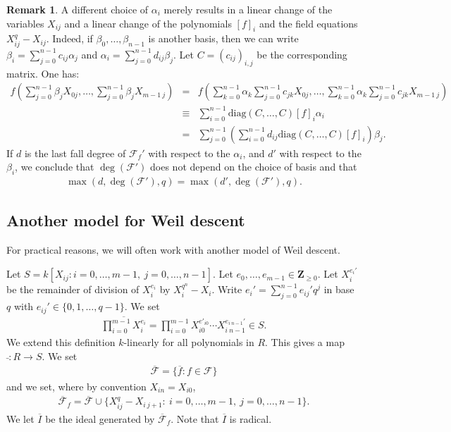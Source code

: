 \documentclass{amsart}
\theoremstyle{plain}
\theoremstyle{definition}
\newtheorem{remark}[theorem]{Remark}
\begin{document}
\begin{remark} \label{812}
A different choice of $\alpha_i$ merely results in a linear change of the variables $X_{ij}$ and a linear change of the polynomials $[f]_i$ and the field equations $X_{ij}^q-X_{ij}$.
Indeed, if $\beta_0,\ldots,\beta_{n-1}$ is another basis, then we can write $\beta_i=\sum_{j=0}^{n-1} c_{ij} \alpha_j$ and $\alpha_i = \sum_{j=0}^{n-1} d_{ij} \beta_j$. Let $C=(c_{ij})_{i,j}$ be the corresponding matrix. One has:
\begin{eqnarray*}
f(\sum_{j=0}^{n-1} \beta_j X_{0j}, \ldots, \sum_{j=0}^{n-1} \beta_j X_{m-1\ j}) &=&  f( \sum_{k=0}^{n-1}  \alpha_k  \sum_{j=0}^{n-1} c_{jk} X_{0j}, \ldots, \sum_{k=0}^{n-1}  \alpha_k  \sum_{j=0}^{n-1} c_{jk} X_{m-1\ j}  ) \\
&\equiv& \sum_{i=0}^{n-1}\mathrm{diag}(C,\ldots,C)  [f]_i \alpha_i \\
&=&\sum_{j=0}^{n-1} \left(   \sum_{i=0}^{n-1}  d_{ij} \mathrm{diag}(C,\ldots,C)  [f]_i \right) \beta_j. 
\end{eqnarray*}
If $d$ is the last fall degree of $\mathcal{F}_f'$ with respect to the $\alpha_i$, and $d'$ with respect to the $\beta_i$, we conclude that $\deg(\mathcal{F}')$ does not depend on the choice of basis and that
\begin{eqnarray*}
\max(d,\deg(\mathcal{F}'),q)=\max(d',\deg(\mathcal{F}'),q).
\end{eqnarray*}
\end{remark} 

\subsection{Another model for Weil descent}

For practical reasons, we will often work with another model of Weil descent.

Let $S=k[X_{ij}: i=0,\ldots,m-1,\ j=0,\ldots, n-1]$. Let $e_0,\ldots,e_{m-1} \in {\mathbf{Z}}_{\geq 0}$. Let $X_{i}^{e_i'}$ be the remainder of division of $X_i^{e_i}$ by $X_i^{q^n}-X_i$. Write $e_i'= \sum_{j=0}^{n-1} e_{ij}'q^j$ in base $q$ with $e_{ij}' \in \{0,1,\ldots,q-1\}$. 
We set
\begin{eqnarray*}
\overline{\prod_{i=0}^{m-1} X_i^{e_i}} = \prod_{i=0}^{m-1} X_{i0}^{e'_{i0}} \cdots X_{i\ n-1}^{e_{i\ n-1}'} \in S.
\end{eqnarray*}
We extend this definition $k$-linearly for all polynomials in $R$. This gives a map $\bar{}: R \to S$.
We set
\begin{eqnarray*}
\overline{\mathcal{F}}=\{ \overline{f}: f \in \mathcal{F} \}
\end{eqnarray*}
and we set, where by convention $X_{in}=X_{i0}$,
\begin{eqnarray*}
\overline{\mathcal{F}}_f = \overline{\mathcal{F}} \cup \{X_{ij}^q-X_{i\ j+1}:\ i=0,\ldots,m-1,\ j=0,\ldots,n-1 \}.
\end{eqnarray*}
We let $\overline{I}$ be the ideal generated by $\overline{\mathcal{F}}_f$. Note that $\overline{I}$ is radical.
\end{document}
